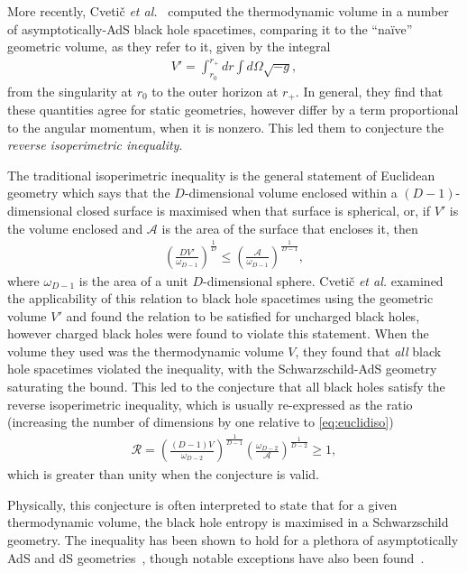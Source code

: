 \documentclass[
twoside,
openright,
frontopenright,
]{dmathesis}
\begin{document}
More recently, Cveti\v c \emph{et al.}~\cite{Cvetic:2010jb} computed the
thermodynamic volume in a number of asymptotically-AdS black hole spacetimes,
comparing it to the ``na\" ive'' geometric volume, as they refer to it, given by
the integral
\begin{align}
  V' = \int_{r_0}^{r_+}dr\int d\Omega \sqrt{-g},
\end{align}
from the singularity at $r_0$ to the outer horizon at $r_+$. In general, they
find that these quantities agree for static geometries, however differ by a term
proportional to the angular momentum, when it is nonzero. This led them to
conjecture the \emph{reverse isoperimetric inequality}.

The traditional isoperimetric inequality is the general statement of Euclidean
geometry which says that the $D$-dimensional volume enclosed within a
$(D-1)$-dimensional closed surface is maximised when that surface is spherical,
or, if $V'$ is the volume enclosed and $\mathcal{A}$ is the area of
the surface that encloses it, then
\begin{align}\label{eq:euclidiso}
\left(\frac{D V'}{\omega_{D-1}}\right)^{\frac{1}{D}} \leqslant
  \left(\frac{\mathcal{A}}{\omega_{D-1}}\right)^{\frac{1}{D-1}},
\end{align}
where $\omega_{D-1}$ is the area of a unit $D$-dimensional sphere. Cveti\v c
\emph{et al.} examined the applicability of this relation to black hole
spacetimes using the geometric volume $V'$ and found the relation to be
satisfied for uncharged black holes, however charged black holes were found to
violate this statement. When the volume they used was the thermodynamic volume
$V$, they found that \emph{all} black hole spacetimes violated the inequality,
with the Schwarzschild-AdS geometry saturating the bound. This led to the
conjecture that all black holes satisfy the reverse isoperimetric inequality,
which is usually re-expressed as the ratio (increasing the number of
  dimensions by one relative to \cref{eq:euclidiso})
\begin{align}
  \mathcal{R} =
  \left(\frac{(D-1)V}{\omega_{D-2}}\right)^{\frac{1}{D-1}}
  \left(\frac{\omega_{D-2}}{\mathcal{A}}\right)^{\frac{1}{D-2}} 
  \geqslant 1,
\end{align}
which is greater than unity when the conjecture is valid.

Physically, this conjecture is often interpreted to state that for a given
thermodynamic volume, the black hole entropy is maximised in a Schwarzschild
geometry. The inequality has been shown to hold for a plethora of asymptotically
AdS and dS geometries~\cite{Cvetic:2010jb,Dolan:2013ft}, though notable
exceptions have also been
found~\cite{Hennigar:2014cfa,Hennigar:2015cja,Brenna:2015pqa}.
\end{document}
